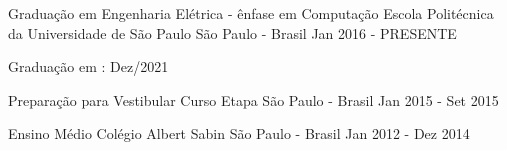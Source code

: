 


\begin{cventries}


\cventry
{Graduação em Engenharia Elétrica - ênfase em Computação} %
{Escola Politécnica da Universidade de São Paulo} %
{São Paulo - Brasil} %
{Jan 2016 - PRESENTE} %
{ %
\begin{cvitems}
\item {Graduação em : Dez/2021}
\end{cvitems}
}
\vspace{4mm}
\cventry
{Preparação para Vestibular} %
{Curso Etapa} %
{São Paulo - Brasil} %
{Jan 2015 - Set 2015} %
{}

\cventry
{Ensino Médio} %
{Colégio Albert Sabin} %
{São Paulo - Brasil} %
{Jan 2012 - Dez 2014} %
{ %
\begin{cvitems}
\end{cvitems}
}
\vspace{-5mm}

\end{cventries}
